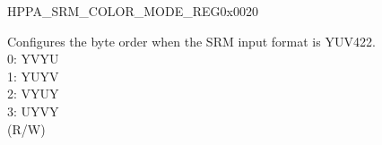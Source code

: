 \addtocounter{Regfloat}{-1}
\begin{register}{H}{PPA\_SRM\_COLOR\_MODE\_REG}{0x0020}
\begin{regdesc}\begin{reglist}
\item [Continued from the previous page...]

\label{fielddesc:PPAYUV422RXBYTEORDER}\item [PPA\_YUV422\_RX\_BYTE\_ORDER] Configures the byte order when the SRM input format is YUV422.\\0: YVYU\\1: YUYV\\2: VYUY\\3: UYVY\\(R/W)
\end{reglist}\end{regdesc}
\end{register}


